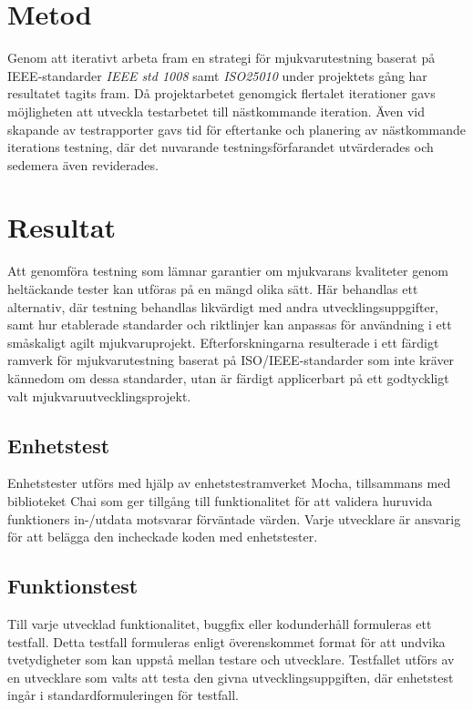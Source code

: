 

\section{Metod}
\label{cha:joakim-method}
Genom att iterativt arbeta fram en strategi för mjukvarutestning baserat på IEEE-standarder \emph{IEEE std 1008} samt \emph{ISO25010} under projektets gång har resultatet tagits fram.\cite{ieee1008}\cite{iso25010} Då projektarbetet genomgick flertalet iterationer gavs möjligheten att utveckla testarbetet till nästkommande iteration. Även vid skapande av testrapporter gavs tid för eftertanke och planering av nästkommande iterations testning, där det nuvarande testningsförfarandet utvärderades och sedemera även reviderades.

\section{Resultat}
\label{cha:joakim-results}
Att genomföra testning som lämnar garantier om mjukvarans kvaliteter genom heltäckande tester kan utföras på en mängd olika sätt. Här behandlas ett alternativ, där testning behandlas likvärdigt med andra utvecklingsuppgifter, samt hur etablerade standarder och riktlinjer kan anpassas för användning i ett småskaligt agilt mjukvaruprojekt. Efterforskningarna resulterade i ett färdigt ramverk för mjukvarutestning baserat på ISO/IEEE-standarder som inte kräver kännedom om dessa standarder, utan är färdigt applicerbart på ett godtyckligt valt mjukvaruutvecklingsprojekt.

\subsection{Enhetstest}
Enhetstester utförs med hjälp av enhetstestramverket Mocha, tillsammans med biblioteket Chai som ger tillgång till funktionalitet för att validera huruvida funktioners in-/utdata motsvarar förväntade värden.\cite{website:mocha}\cite{website:chai} Varje utvecklare är ansvarig för att belägga den incheckade koden med enhetstester. 

\subsection{Funktionstest}
Till varje utvecklad funktionalitet, buggfix eller kodunderhåll formuleras ett testfall. Detta testfall formuleras enligt överenskommet format för att undvika tvetydigheter som kan uppstå mellan testare och utvecklare. Testfallet utförs av en utvecklare som valts att testa den givna utvecklingsuppgiften, där enhetstest ingår i standardformuleringen för testfall. 


